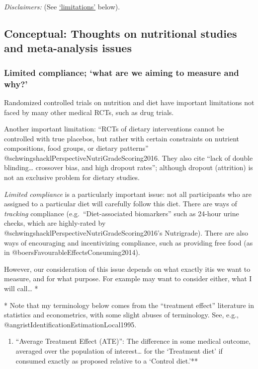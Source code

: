 \documentclass[]{article}
\providecommand{\tightlist}{%
  \setlength{\itemsep}{0pt}\setlength{\parskip}{0pt}}
\begin{document}
\emph{Disclaimers:} (See \protect\hyperlink{limitations}{`limitations'}
below).

\hypertarget{conceptual}{%
\subsection{Conceptual: Thoughts on nutritional studies and
meta-analysis issues}\label{conceptual}}

\hypertarget{compliance}{%
\subsubsection{Limited compliance; `what are we aiming to measure and
why?'}\label{compliance}}

Randomized controlled trials on nutrition and diet have important
limitations not faced by many other medical RCTs, such as drug trials.

Another important limitation: ``RCTs of dietary interventions cannot be
controlled with true placebos, but rather with certain constraints on
nutrient compositions, food groups, or dietary patterns''
@schwingshacklPerspectiveNutriGradeScoring2016. They also cite ``lack of
double blinding\ldots{} crossover bias, and high dropout rates'';
although dropout (attrition) is not an exclusive problem for dietary
studies.

\emph{Limited compliance} is a particularly important issue: not all
participants who are assigned to a particular diet will carefully follow
this diet. There are ways of \emph{tracking} compliance
(e.g.~``Diet-associated biomarkers'' such as 24-hour urine checks, which
are highly-rated by @schwingshacklPerspectiveNutriGradeScoring2016's
Nutrigrade). There are also ways of encouraging and incentivizing
compliance, such as providing free food (as in
@boersFavourableEffectsConsuming2014).

However, our consideration of this issue depends on what exactly itis we
want to measure, and for what purpose. For example may want to consider
either, what I will call\ldots{} *

* Note that my terminology below comes from the ``treatment effect''
literature in statistics and econometrics, with some slight abuses of
terminology. See, e.g., @angristIdentificationEstimationLocal1995.

\begin{enumerate}
\def\labelenumi{\arabic{enumi}.}
\tightlist
\item
  ``Average Treatment Effect (ATE)'': The difference in some medical
  outcome, averaged over the population of interest\ldots{} for the
  `Treatment diet' if consumed exactly as proposed relative to a
  `Control diet.'**
\end{enumerate}
\end{document}
